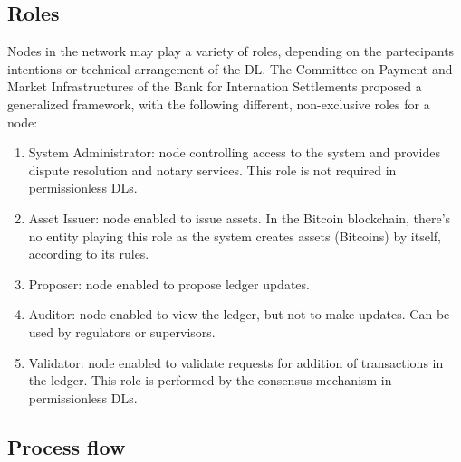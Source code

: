 \subsection{Roles}
Nodes in the network may play a variety of roles, depending on the partecipants intentions or technical arrangement of the DL. The Committee on Payment and Market Infrastructures of the Bank for Internation Settlements proposed a generalized framework, with the following different, non-exclusive roles for a node:

\begin{enumerate}
    \item System Administrator: node controlling access to the system and provides dispute resolution and notary services. This role is not required in permissionless DLs.
    \item Asset Issuer: node enabled to issue assets. In the Bitcoin blockchain, there's no entity playing this role as the system creates assets (Bitcoins) by itself, according to its rules.
    \item Proposer: node enabled to propose ledger updates.
    \item Auditor: node enabled to view the ledger, but not to make updates. Can be used by regulators or supervisors.
    \item Validator: node enabled to validate requests for addition of transactions in the ledger. This role is performed by the consensus mechanism in permissionless DLs.
\end{enumerate}

\subsection{Process flow}
